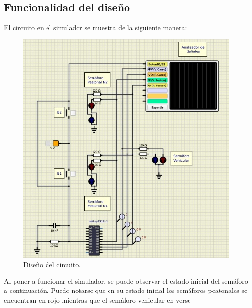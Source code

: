 \newpage
\subsection{Funcionalidad del diseño}
El circuito en el simulador se muestra de la siguiente manera:
\begin{figure}[H]
    \centering
    \includegraphics[scale=0.4]{images/Circuito_semaforo.jpeg}
    \caption{Diseño del circuito.}
    \label{fig:semaforo}
\end{figure}

Al poner a funcionar el simulador, se puede observar el estado inicial del semáforo a continuación. Puede notarse que en su estado inicial los semáforos peatonales se encuentran en rojo mientras que el semáforo vehicular en verse

